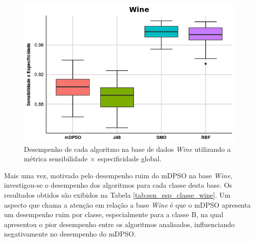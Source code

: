 \documentclass[
	12pt,				%
	openany,			%
	oneside,	
	a4paper,			%
	brazil,				%
	]{unimontes-ppgmsc-abntex2}
\begin{document}
\begin{figure}[!ht]
\centering
\includegraphics[scale=.7]{graficos/wine}
\caption{Desempenho de cada algoritmo na base de dados {\em Wine} utilizando a métrica sensibilidade $\times$ especificidade global.}
\label{fig:wine}
\end{figure}

\begin{table}[!ht]
\setlength{\arrayrulewidth}{.2em}
\vspace{12pt}
\centering{}
\caption{p-valor medido para o produto da sensibilidade $\times$ especificidade global de cada algoritmo na base de dados {\em Wine}.}
\label{tab:pvalor_wine}
\end{table}

Mais uma vez, motivado pelo desempenho ruim do mDPSO na base \emph{Wine}, investigou-se o desempenho dos algoritmos para cada classe desta base. Os resultados obtidos são exibidos na Tabela \ref{tab:sen_esp_classe_wine}. Um aspecto que chama a atenção em relação a base {\em Wine} é que o mDPSO apresenta um desempenho ruim por classe, especialmente para a classe B, na qual apresentou o pior desempenho entre os algoritmos analisados, influenciando negativamente no desempenho do mDPSO. 
\end{document}
